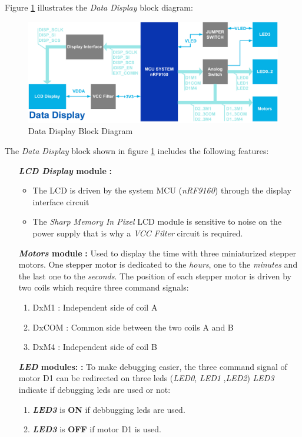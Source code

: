 \documentclass[report.tex]{subfiles}
\begin{document}
Figure \ref{fig:data_display_blk} illustrates the \textit{Data Display} block diagram:

\begin{figure}[H]
	\centering
	\includegraphics[width=1\textwidth]{Include/Figure/Hardware/data_display_blk.pdf}
	\caption{Data Display Block Diagram}
	\label{fig:data_display_blk}
\end{figure}

\begin{flushleft}
The \textit{Data Display} block shown in figure \ref{fig:data_display_blk} includes the following features:
\end{flushleft}
\begin{itemize}
\item  [\quad\textbf{\textit{LCD Display} module}]\textbf{:}
\begin{itemize}
\item The LCD is driven by the system MCU (\textit{nRF9160}) through the display interface circuit
\item The \textit{Sharp Memory In Pixel} LCD module is sensitive to noise on the power supply that is why a \textit{VCC Filter} circuit is required. 
\end{itemize} 
\item [\quad\textbf{\textit{Motors} module}]\textbf{:}
Used to display the time with three miniaturized stepper motors. One stepper motor is dedicated to the \textit{hours}, one to the \textit{minutes} and the last one to the \textit{seconds}. The position of each stepper motor is driven by two coils which require three command signals:
\begin{enumerate}
\item DxM1 : Independent side of coil A
\item DxCOM : Common side between the two coils A and B
\item DxM4 : Independent side of coil B
\end{enumerate}
\item [\quad\textbf{\textit{LED} modules:}]\textbf{:}
To make debugging easier, the three command signal of motor D1 can be redirected on three leds (\textit{LED0}, \textit{LED1} ,\textit{LED2}) \textit{LED3} indicate if debugging leds are used or not:
\begin{enumerate}
\item \textbf{\textit{LED3}} is \textbf{ON} if debbugging leds are used.
\item \textbf{\textit{LED3}} is \textbf{OFF} if motor D1 is used.
\end{enumerate}
\end{itemize}
\end{document}
